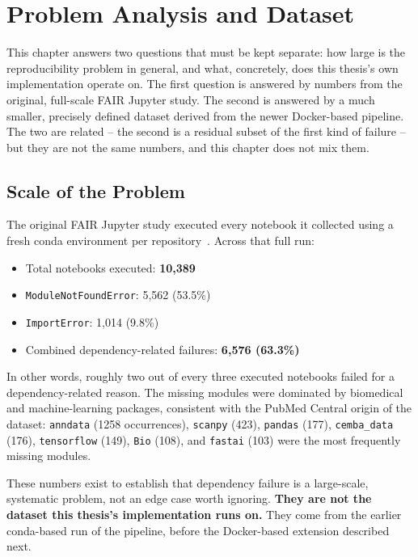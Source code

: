 \chapter{Problem Analysis and Dataset}
\label{chap:problem-dataset}

This chapter answers two questions that must be kept separate: how large is
the reproducibility problem in general, and what, concretely, does this
thesis's own implementation operate on. The first question is answered by
numbers from the original, full-scale FAIR Jupyter study. The second is
answered by a much smaller, precisely defined dataset derived from the newer
Docker-based pipeline. The two are related -- the second is a residual
subset of the first kind of failure -- but they are not the same numbers, and
this chapter does not mix them.

\section{Scale of the Problem}
\label{sec:pd-l1}

The original FAIR Jupyter study executed every notebook it collected using a
fresh conda environment per repository~\cite{samuel2024gigascience}. Across
that full run:

\begin{itemize}
  \item Total notebooks executed: \textbf{10,389}
  \item \texttt{ModuleNotFoundError}: 5,562 (53.5\%)
  \item \texttt{ImportError}: 1,014 (9.8\%)
  \item Combined dependency-related failures: \textbf{6,576 (63.3\%)}
\end{itemize}

In other words, roughly two out of every three executed notebooks failed for
a dependency-related reason. The missing modules were dominated by
biomedical and machine-learning packages, consistent with the PubMed Central
origin of the dataset: \texttt{anndata} (1258 occurrences),
\texttt{scanpy} (423), \texttt{pandas} (177), \texttt{cemba\_data} (176),
\texttt{tensorflow} (149), \texttt{Bio} (108), and \texttt{fastai} (103) were
the most frequently missing modules.

These numbers exist to establish that dependency failure is a large-scale,
systematic problem, not an edge case worth ignoring. \textbf{They are not the
dataset this thesis's implementation runs on.} They come from the earlier
conda-based run of the pipeline, before the Docker-based extension described
next.

